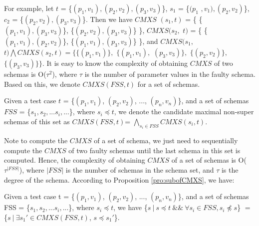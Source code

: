 For example, let $t$ = \{$(p_{1},v_{1}), (p_{2}, v_{2}), (p_{3}, v_{3})$\}, $s_{1}$ = \{$(p_{1}$ $, v_{1}), (p_{2}, v_{2})$\}, $c_{2}$ = \{$(p_{2}, v_{2}), (p_{3}, v_{3})$\}. Then we have $CMXS$ $(s_{1}, t)$ = \{ \{$(p_{1}, v_{1}), (p_{3}, v_{3})$\}, \{$(p_{2}, v_{2}), (p_{3}, v_{3})$\} \}, $CMXS(s_{2},$ $ t)$ = \{ \{$(p_{1}, v_{1}), (p_{2}, v_{2})$\}, \{$(p_{1}, v_{1}), (p_{3}, v_{3})$\} \}, and  $CMXS(s_{1},$ $ t) \bigwedge CMXS(s_{2}, t) = \{ \{(p_{1}, v_{1})\},$ $ \{(p_{1}, v_{1}), $ $(p_{3}, v_{3})\}, $ $ \{(p_{2}, v_{2})\}, $ $\{(p_{3}, v_{3})\} \} $. It is easy to know the complexity of obtaining $CMXS$ of two schemas is O($\tau^{2}$), where $\tau$ is the number of parameter values in the faulty schema. Based on this, we denote $CMXS(FSS,t)$ for a set of schemas.

\begin{definition}
Given a test case $t$ = \{$(p_{1}, v_{1})$, $(p_{2}, v_{2})$, ..., $(p_{n}, v_{n})$\}, and a set of schemas $FSS$ = \{$s_{1} , s_{2}, ... s_{i}, ...$\}, where $ s_{i} \preceq t$,  we denote the candidate maximal non-super schemas of this set as $CMXS(FSS,t)$= $\bigwedge_{s_{i}\in FSS} CMXS(s_{i}, t)$.
\end{definition}

Note to compute the $CMXS$ of a set of schema, we just need to sequentially compute the $CMXS$ of two faulty schemas until the last schema in this set is computed. Hence, the complexity of obtaining $CMXS$ of a set of schemas is O($\tau^{|FSS|}$), where $|FSS|$ is the number of schemas in the schema set, and $\tau$ is the degree of the schema. According to Proposition \ref{pro:subofCMXS}, we have:

\begin{proposition}\label{pro:subofCMXSfor2}
Given a test case t = \{$(p_{1}, v_{1})$, $(p_{2}, v_{2})$, ..., $(p_{n}, v_{n})$\}, and a set of schemas FSS = \{$s_{1} , s_{2}, ... s_{i}, ...$\}, where $ s_{i} \preceq t$,  we have \{$s\ |\ s \preceq t\ \&\&\ \forall s_{i} \in FSS, s_{i} \npreceq s $\} $=$  \{$ s\ |\ \exists s_{1}' \in CMXS(FSS, t)$, $s \preceq s_{1}'$\}.
\end{proposition}


